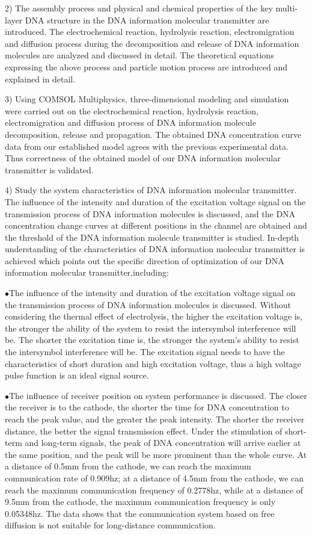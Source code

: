 \begin{digest}
  2) The assembly process and physical and chemical properties of the key multi-layer DNA structure in the DNA information molecular transmitter are introduced. The electrochemical reaction, hydrolysis reaction, electromigration and diffusion process during the decomposition and release of DNA information molecules are analyzed and discussed in detail. The theoretical equations expressing the above process and particle motion process are introduced and explained in detail.
  
  3) Using COMSOL Multiphysics, three-dimensional modeling and simulation were carried out on the electrochemical reaction, hydrolysis reaction, electromigration and diffusion process of DNA information molecule decomposition, release and propagation. The obtained DNA concentration curve data from our established model agrees with the previous experimental data. Thus correctness of the obtained model of our DNA information molecular transmitter is validated.
  
  4) Study the system characteristics of DNA information molecular transmitter. The influence of the intensity and duration of the excitation voltage signal on the transmission process of DNA information molecules is discussed, and the DNA concentration change curves at different positions in the channel are obtained and the threshold of the DNA information molecule transmitter is studied. In-depth understanding of the characteristics of DNA information molecular transmitter is achieved which points out the specific direction of optimization of our DNA information molecular transmitter,including:
  
  $\bullet$The influence of the intensity and duration of the excitation voltage signal on the transmission process of DNA information molecules is discussed. Without considering the thermal effect of electrolysis, the higher the excitation voltage is, the stronger the ability of the system to resist the intersymbol interference will be. The shorter the excitation time is, the stronger the system's ability to resist the intersymbol interference will be. The excitation signal needs to have the characteristics of short duration and high excitation voltage, thus a high voltage pulse function is an ideal signal source.
  
  $\bullet$The influence of receiver position on system performance is discussed. The closer the receiver is to the cathode, the shorter the time for DNA concentration to reach the peak value, and the greater the peak intensity. The shorter the receiver distance, the better the signal transmission effect. Under the stimulation of short-term and long-term signals, the peak of DNA concentration will arrive earlier at the same position, and the peak will be more prominent than the whole curve. At a distance of 0.5mm from the cathode, we can reach the maximum communication rate of 0.909hz; at a distance of 4.5mm from the cathode, we can reach the maximum communication frequency of 0.2778hz, while at a distance of 9.5mm from the cathode, the maximum communication frequency is only 0.05348hz. The data shows that the communication system based on free diffusion is not suitable for long-distance communication.
  

\end{digest}
